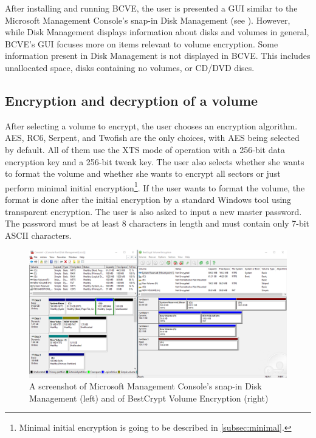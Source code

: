 \documentclass[thesis=B,english]{FITthesis}[2012/10/20]
\begin{document}
	After installing and running BCVE, the user is presented a GUI similar to the Microsoft Management Console's snap-in Disk Management (see \-). However, while Disk Management displays information about disks and volumes in general, BCVE's GUI focuses more on items relevant to volume encryption. Some information present in Disk Management is not displayed in BCVE. This includes unallocated space, disks containing no volumes, or CD/DVD discs. 
	
	
	
	\subsection{Encryption and decryption of a volume}
	
	After selecting a volume to encrypt, the user chooses an encryption algorithm. AES, RC6, Serpent, and Twofish are the only choices, with AES being selected by default. All of them use the XTS mode of operation with a 256-bit data encryption key and a 256-bit tweak key. The user also selects whether she wants to format the volume and whether she wants to encrypt all sectors or just perform minimal initial encryption\footnote {Minimal initial encryption is going to be described in \cref{subsec:minimal}.}. If the user wants to format the volume, the format is done after the initial encryption by a standard Windows tool using transparent encryption. The user is also asked to input a new master password. The password must be at least 8 characters in length and must contain only 7-bit ASCII characters.
	
	\begin{figure}
		\includegraphics[width=\linewidth]{bcve_mmc_ss.png}
		\caption[Similarity between BCVE's and Disk Management's GUIs]{A screenshot of Microsoft Management Console's snap-in Disk Management (left) and of BestCrypt Volume Encryption (right)}
		\label{fig:bcvemmc}
	\end{figure}
	
\end{document}
